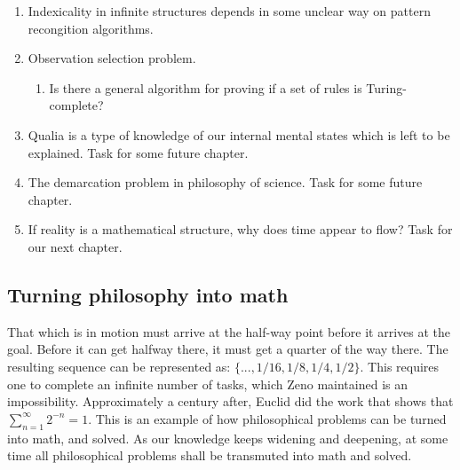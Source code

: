 \vspace{10px}

\begin{enumerate}
\item Indexicality in infinite structures depends in some unclear way on pattern recongition algorithms.
\item Observation selection problem.
\begin{enumerate}
\item Is there a general algorithm for proving if a set of rules is Turing-complete?
\end{enumerate}
\item Qualia is a type of knowledge of our internal mental states which is left to be explained. Task for some future chapter.
\item The demarcation problem in philosophy of science. Task for some future chapter.
\item If reality is a mathematical structure, why does time appear to flow? Task for our next chapter.
\end{enumerate}

\newpage

\subsection{Turning philosophy into math}

That which is in motion must arrive at the half-way point before it arrives at the goal.
Before it can get halfway there, it must get a quarter of the way there.
The resulting sequence can be represented as: $\{..., 1/16, 1/8, 1/4, 1/2\}$.
This requires one to complete an infinite number of tasks, which Zeno maintained is an impossibility.
Approximately a century after, Euclid did the work that shows that $\sum_{n=1}^{\infty} 2^{-n} = 1$.
This is an example of how philosophical problems can be turned into math, and solved.
As our knowledge keeps widening and deepening, at some time all philosophical problems shall be transmuted into math and solved.

\newpage




